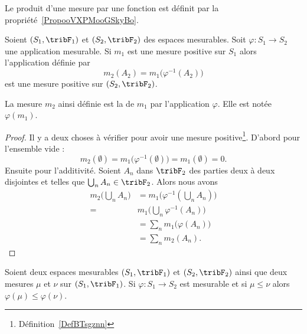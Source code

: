 Le produit d'une mesure par une fonction est définit par la propriété~\ref{PropooVXPMooGSkyBo}.

\begin{propositionDef}     \label{PropJCJQooAdqrGA}
    Soient \( (S_1,\tribF_1)\) et \( (S_2,\tribF_2)\) des espaces mesurables. Soit \( \varphi\colon S_1\to S_2\) une application mesurable. Si \( m_1\) est une mesure positive sur \( S_1\) alors l'application définie par
    \begin{equation}
        m_2(A_2)=m_1\big( \varphi^{-1}(A_2) \big)
    \end{equation}
    est une mesure positive sur \( (S_2,\tribF_2)\).

    La mesure \( m_2\) ainsi définie est la  de \( m_1\) par l'application \( \varphi\). Elle est notée \( \varphi(m_1)\).
\end{propositionDef}

\begin{proof}
    Il y a deux choses à vérifier pour avoir une mesure positive\footnote{Définition~\ref{DefBTsgznn}}. D'abord pour l'ensemble vide :
    \begin{equation}
        m_2(\emptyset)=m_1\big( \varphi^{-1}(\emptyset) \big)=m_1(\emptyset)=0.
    \end{equation}
    Ensuite pour l'additivité. Soient \( A_n\) dans \( \tribF_2\) des parties deux à deux disjointes et telles que \( \bigcup_nA_n\in\tribF_2\). Alors nous avons
    \begin{subequations}
        \begin{align}
            m_2\big( \bigcup_nA_n \big)&=m_1\Big( \varphi^{-1}(\bigcup_nA_n) \Big)\\
            =&m_1\big( \bigcup_n\varphi^{-1}(A_n) \big)\\
            &=\sum_nm_1\big( \varphi(A_n) \big)\\
            &=\sum_nm_2(A_n).
        \end{align}
    \end{subequations}
\end{proof}

\begin{lemma}
    Soient deux espaces mesurables \( (S_1,\tribF_1)\) et \( (S_2,\tribF_2)\) ainsi que deux mesures \( \mu\) et \( \nu\) sur \( (S_1,\tribF_1)\). Si \( \varphi\colon S_1\to S_2\) est mesurable et si \( \mu\leq \nu\) alors \( \varphi(\mu)\leq \varphi(\nu)\).
\end{lemma}

